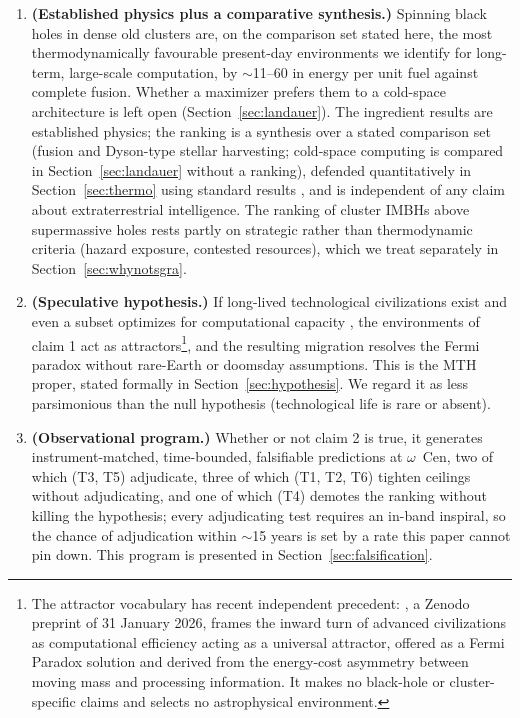 \documentclass[11pt]{article}
\begin{document}
\begin{enumerate}
\item \textbf{(Established physics plus a comparative synthesis.)} Spinning black holes in dense old clusters are, on the comparison set stated here, the most thermodynamically favourable present-day environments we identify for long-term, large-scale computation, by $\sim$11--60 in energy per unit fuel against complete fusion. Whether a maximizer prefers them to a cold-space architecture is left open (Section~\ref{sec:landauer}). The ingredient results are established physics; the ranking is a synthesis over a stated comparison set (fusion and Dyson-type stellar harvesting; cold-space computing is compared in Section~\ref{sec:landauer} without a ranking), defended quantitatively in Section~\ref{sec:thermo} using standard results \citep{NovikovThorne1973,BlandfordZnajek1977,Bekenstein1974,Landauer1961,Lloyd2000}, and is independent of any claim about extraterrestrial intelligence. The ranking of cluster IMBHs above supermassive holes rests partly on strategic rather than thermodynamic criteria (hazard exposure, contested resources), which we treat separately in Section~\ref{sec:whynotsgra}.
\item \textbf{(Speculative hypothesis.)} If long-lived technological civilizations exist and even a subset optimizes for computational capacity \citep{Sandberg1999}, the environments of claim 1 act as attractors\footnote{The attractor vocabulary has recent independent precedent: \citet{Kriger2026}, a Zenodo preprint of 31 January 2026, frames the inward turn of advanced civilizations as computational efficiency acting as a universal attractor, offered as a Fermi Paradox solution and derived from the energy-cost asymmetry between moving mass and processing information. It makes no black-hole or cluster-specific claims and selects no astrophysical environment.}, and the resulting migration resolves the Fermi paradox without rare-Earth or doomsday assumptions. This is the MTH proper, stated formally in Section~\ref{sec:hypothesis}. We regard it as less parsimonious than the null hypothesis (technological life is rare or absent).
\item \textbf{(Observational program.)} Whether or not claim 2 is true, it generates instrument-matched, time-bounded, falsifiable predictions at $\omega$~Cen, two of which (T3, T5) adjudicate, three of which (T1, T2, T6) tighten ceilings without adjudicating, and one of which (T4) demotes the ranking without killing the hypothesis; every adjudicating test requires an in-band inspiral, so the chance of adjudication within $\sim$15 years is set by a rate this paper cannot pin down. This program is presented in Section~\ref{sec:falsification}.
\end{enumerate}
\end{document}
